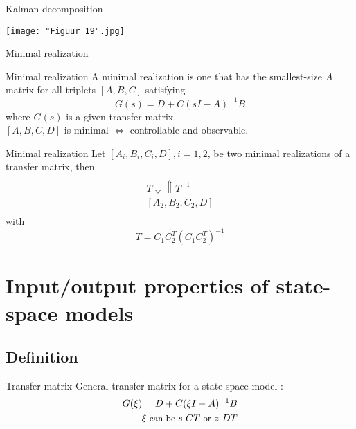 \begin{frame}{Kalman decomposition}
\begin{center}
    \texttt{[image: "Figuur 19".jpg]}
\end{center}
\end{frame}

\begin{subsection}{Minimal realization}
\begin{frame}{Minimal realization}
A minimal realization is one that has the smallest-size $A$ matrix for all triplets $[A,B,C]$ satisfying
$$G(s) = D + C(sI − A)^{−1}B$$
where $G(s)$ is a given transfer matrix.\\
\vspace{0.2cm}
$[A,B,C,D]$ is minimal $\iff$ controllable and observable.\\
\end{frame}

\begin{frame}{Minimal realization}
Let $[A_i,B_i,C_i,D],i=1,2$, be two minimal realizations
of a transfer matrix, then
    \begin{align*}
    [A_1,B_1,C_1,D]\\
    T\Downarrow\Uparrow T^{-1}\\
    [A_2,B_2,C_2,D]\\
    \end{align*}
with
$$T=C_1C_2^T(C_1C_2^T)^{-1}$$
\end{frame}

\section{Input/output properties of state-space
models}
\subsection{Definition}
\begin{frame}{Transfer matrix}
General transfer matrix for a state space model :
\begin{align*}
G(\xi)=D+C(\xi I-A)^{-1}B\\
\small{\xi\text{ can be }s\text{ }CT\text{ or }z\text{ }DT}
\end{align*}
\end{frame}


\end{subsection}
